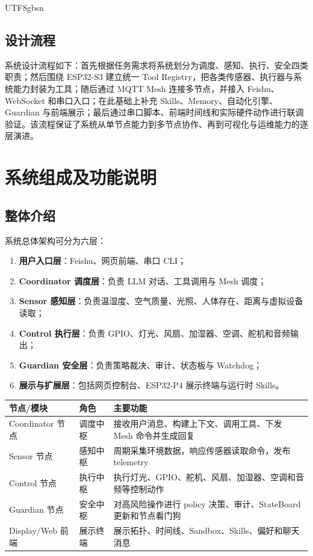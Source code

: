 \documentclass[a4paper,12pt]{article}
\begin{document}
\begin{CJK*}{UTF8}{gbsn}
\subsection{设计流程}
系统设计流程如下：首先根据任务需求将系统划分为调度、感知、执行、安全四类职责；然后围绕 ESP32-S3 建立统一 Tool Registry，把各类传感器、执行器与系统能力封装为工具；随后通过 MQTT Mesh 连接多节点，并接入 Feishu、WebSocket 和串口入口；在此基础上补充 Skills、Memory、自动化引擎、Guardian 与前端展示；最后通过串口脚本、前端时间线和实际硬件动作进行联调验证。该流程保证了系统从单节点能力到多节点协作、再到可视化与运维能力的逐层演进。

\section{系统组成及功能说明}

\subsection{整体介绍}
系统总体架构可分为六层：
\begin{enumerate}
  \item \textbf{用户入口层}：Feishu、网页前端、串口 CLI；
  \item \textbf{Coordinator 调度层}：负责 LLM 对话、工具调用与 Mesh 调度；
  \item \textbf{Sensor 感知层}：负责温湿度、空气质量、光照、人体存在、距离与虚拟设备读取；
  \item \textbf{Control 执行层}：负责 GPIO、灯光、风扇、加湿器、空调、舵机和音频输出；
  \item \textbf{Guardian 安全层}：负责策略裁决、审计、状态板与 Watchdog；
  \item \textbf{展示与扩展层}：包括网页控制台、ESP32-P4 展示终端与运行时 Skills。
\end{enumerate}

\begin{table}[h]
\centering
\begin{tabular}{p{3.2cm}p{3.2cm}p{7.0cm}}
\toprule
\textbf{节点/模块} & \textbf{角色} & \textbf{主要功能} \\
\midrule
Coordinator 节点 & 调度中枢 & 接收用户消息、构建上下文、调用工具、下发 Mesh 命令并生成回复 \\
Sensor 节点 & 感知中枢 & 周期采集环境数据，响应传感器读取命令，发布 telemetry \\
Control 节点 & 执行中枢 & 执行灯光、GPIO、舵机、风扇、加湿器、空调和音频等控制动作 \\
Guardian 节点 & 安全中枢 & 对高风险操作进行 policy 决策、审计、StateBoard 更新和节点看门狗 \\
Display/Web 前端 & 展示终端 & 展示拓扑、时间线、Sandbox、Skills、偏好和聊天消息 \\
\bottomrule
\end{tabular}
\end{table}


\end{CJK*}
\end{document}
